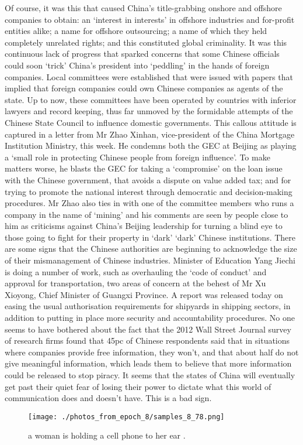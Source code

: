 \documentclass{article}%
\begin{document}
Of course, it was this that caused China’s title{-}grabbing onshore and offshore companies to obtain: an ‘interest in interests’ in offshore industries and for{-}profit entities alike; a name for offshore outsourcing; a name of which they held completely unrelated rights; and this constituted global criminality.\newline%
It was this continuous lack of progress that sparked concerns that some Chinese officials could soon ‘trick’ China’s president into ‘peddling’ in the hands of foreign companies. Local committees were established that were issued with papers that implied that foreign companies could own Chinese companies as agents of the state. Up to now, these committees have been operated by countries with inferior lawyers and record keeping, thus far unmoved by the formidable attempts of the Chinese State Council to influence domestic governments.\newline%
This callous attitude is captured in a letter from Mr Zhao Xinhan, vice{-}president of the China Mortgage Institution Ministry, this week. He condemns both the GEC at Beijing as playing a ‘small role in protecting Chinese people from foreign influence’. To make matters worse, he blasts the GEC for taking a ‘compromise’ on the loan issue with the Chinese government, that avoids a dispute on value added tax; and for trying to promote the national interest through democratic and decision{-}making procedures.\newline%
Mr Zhao also ties in with one of the committee members who runs a company in the name of ‘mining’ and his comments are seen by people close to him as criticisms against China’s Beijing leadership for turning a blind eye to those going to fight for their property in ‘dark’ ‘dark’ Chinese institutions.\newline%
There are some signs that the Chinese authorities are beginning to acknowledge the size of their mismanagement of Chinese industries. Minister of Education Yang Jiechi is doing a number of work, such as overhauling the ‘code of conduct’ and approval for transportation, two areas of concern at the behest of Mr Xu Xioyong, Chief Minister of Guangxi Province. A report was released today on easing the usual authorisation requirements for shipyards in shipping sectors, in addition to putting in place more security and accountability procedures.\newline%
No one seems to have bothered about the fact that the 2012 Wall Street Journal survey of research firms found that 45pc of Chinese respondents said that in situations where companies provide free information, they won’t, and that about half do not give meaningful information, which leads them to believe that more information could be released to stop piracy.\newline%
It seems that the states of China will eventually get past their quiet fear of losing their power to dictate what this world of communication does and doesn’t have. This is a bad sign.\newline%

%


\begin{figure}[h!]%
\centering%
\texttt{[image: ./photos\_from\_epoch\_8/samples\_8\_78.png]}%
\caption{a woman is holding a cell phone to her ear .}%
\end{figure}

%
\end{document}
